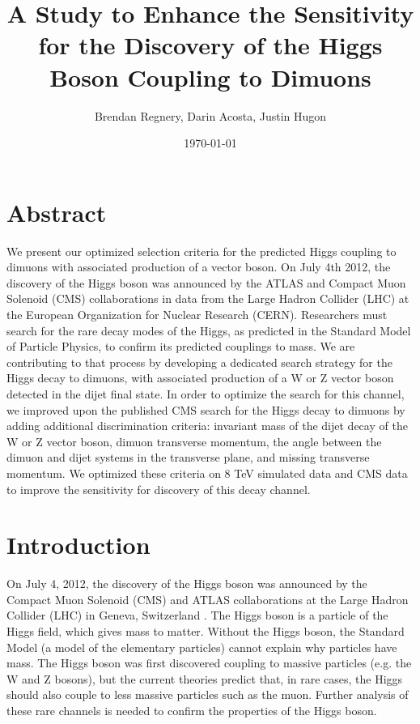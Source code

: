 \documentclass[12pt]{article}
\title{A Study to Enhance the Sensitivity for the Discovery of the Higgs Boson Coupling to Dimuons}
\author{Brendan Regnery, Darin Acosta, Justin Hugon}
\date{\today}
\begin{document}
\maketitle

\section{Abstract}

We present our optimized selection criteria for the predicted Higgs coupling to dimuons with associated 
production of a vector boson. On July 4th 2012, the discovery of the Higgs boson was announced by the 
ATLAS and Compact Muon Solenoid (CMS) collaborations in data from the Large Hadron Collider (LHC) at the 
European Organization for Nuclear Research (CERN). Researchers must search for the rare decay modes of 
the Higgs, as predicted in the Standard Model of Particle Physics, to confirm its predicted couplings to 
mass. We are contributing to that process by developing a dedicated search strategy for the Higgs decay to 
dimuons, with associated production of a W or Z vector boson detected in the dijet final state.  In order 
to optimize the search for this channel, we improved upon the published CMS search for the Higgs decay 
to dimuons by adding additional discrimination criteria: invariant mass of the dijet decay of the W or 
Z vector boson, dimuon transverse momentum, the angle between the dimuon and dijet systems in the transverse 
plane, and missing transverse momentum. We optimized these criteria on 8 TeV simulated data and CMS data 
to improve the sensitivity for discovery of this decay channel. 

\section{Introduction}

On July 4, 2012, the discovery of the Higgs boson was announced by the Compact Muon Solenoid (CMS) and ATLAS collaborations 
at the Large Hadron Collider (LHC) in Geneva, Switzerland \cite{HiggsDisc}.
The Higgs boson is a particle of the Higgs field, which gives mass to matter. Without the Higgs boson, 
the Standard Model (a model of the elementary particles) cannot explain why particles have mass. 
The Higgs boson was first discovered coupling to massive particles (e.g. the W and Z bosons), 
but the current theories predict that, in rare cases, the Higgs should also couple to less massive particles such as the muon. 
Further analysis of these rare channels is needed to confirm the properties of the Higgs boson. 
\end{document}
